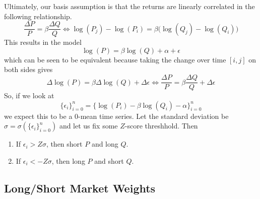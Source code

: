 \documentclass{article}
\begin{document}
    Ultimately, our basis assumption is that the returns are linearly correlated in the following relationship. 
    \[\frac{\Delta P}{P} = \beta \frac{\Delta Q}{Q} \iff \log(P_j) - \log(P_i) = \beta \big( \log(Q_j) - \log(Q_i) \big)\]
    This results in the model 
    \[\log(P) = \beta \log(Q) + \alpha + \epsilon\]
    which can be seen to be equivalent because taking the change over time $[i, j]$ on both sides gives 
    \[\Delta \log(P) = \beta \Delta \log(Q) + \Delta \epsilon \iff \frac{\Delta P}{P} = \beta \frac{\Delta Q}{Q} + \Delta\epsilon \]
    So, if we look at
    \[\{\epsilon_i\}_{i=0}^n = \{\log(P_i) - \beta \log(Q_i) - \alpha\}_{i=0}^n \]
    we expect this to be a $0$-mean time series. Let the standard deviation be $\sigma = \sigma(\{\epsilon_i\}_{i=0}^n)$ and let us fix some $Z$-score threshhold. Then 
    \begin{enumerate}
        \item If $\epsilon_i > Z \sigma$, then short $P$ and long $Q$. 
        \item If $\epsilon_i < -Z \sigma$, then long $P$ and short $Q$. 
    \end{enumerate}

  \subsection{Long/Short Market Weights}
\end{document}
